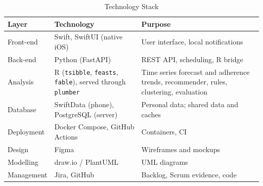 \documentclass[conference]{IEEEtran}
\newcommand{\pkg}[1]{\texttt{#1}}
\begin{document}
\begin{table}[!t]
\caption{Technology Stack}
\label{tab:stack}
\centering
\footnotesize
\begin{tabular}{@{}lL{2.9cm}L{2.7cm}@{}}
\toprule
Layer & Technology & Purpose \\
\midrule
Front-end & Swift, SwiftUI (native iOS) & User interface, local notifications \\
Back-end & Python (FastAPI) & REST API, scheduling, R bridge \\
Analysis & R (\pkg{tsibble}, \pkg{feasts}, \pkg{fable}), served through \pkg{plumber} & Time series forecast and adherence trends, recommender, rules, clustering, evaluation \\
Database & SwiftData (phone), PostgreSQL (server) & Personal data; shared data and caches \\
Deployment & Docker Compose, GitHub Actions & Containers, CI \\
Design & Figma & Wireframes and mockups \\
Modelling & draw.io / PlantUML & UML diagrams \\
Management & Jira, GitHub & Backlog, Scrum evidence, code \\
\bottomrule
\end{tabular}
\end{table}
\end{document}
